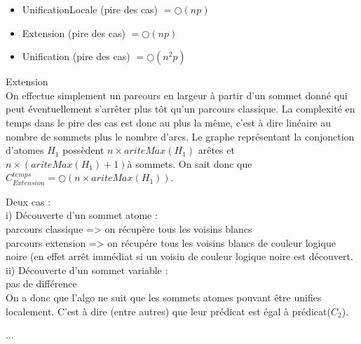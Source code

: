 \begin{itemize}
	\item UnificationLocale (pire des cas) $= \bigcirc(np)$
	\item Extension (pire des cas) $= \bigcirc(np)$
	\item Unification (pire des cas) $= \bigcirc(n^{2}p)$
\end{itemize}

Extension\\
On effectue simplement un parcours en largeur \`a partir d'un sommet donn\'e qui peut \'eventuellement s'arr\^eter plus
t\^ot qu'un parcours classique. La complexit\'e en temps dans le pire des cas est donc au plus la m\^eme, c'est \`a dire lin\'eaire
au nombre de sommets plus le nombre d'arcs. Le graphe repr\'esentant la conjonction d'atomes $H_{1}$ poss\`edent $n \times ariteMax(H_{1})$ ar\^etes
et $n \times (ariteMax(H_{1}) + 1)à$ sommets.
On sait donc que $C_{Extension}^{temps} = \bigcirc(n \times ariteMax(H_1))$.


Deux cas :\\
	i) D\'ecouverte d'un sommet atome : \\
		parcours classique => on r\'ecup\`ere tous les voisins blancs \\
		parcours extension => on r\'ecup\'ere tous les voisins blancs de couleur logique noire (en effet arr\^et imm\'ediat si un voisin de couleur logique noire est d\'ecouvert.\\
	ii) D\'ecouverte d'un sommet variable :\\
		pas de diff\'erence\\
On a donc que l'algo ne suit que les sommets atomes pouvant \^etre unifies localement. C'est \`a dire (entre autres) que leur pr\'edicat est \'egal \`a pr\'edicat($C_{2}$).



...




